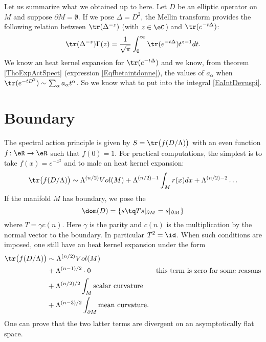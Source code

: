 Let us summarize what we obtained up to here. Let $D$ be an elliptic operator on $M$ and suppose $\partial M=\emptyset$. If we pose $\Delta=D^2$, the Mellin transform provides the following relation between $\tr(\Delta^{-z})$ (with $z\in\eC$) and $\tr( e^{-t\Delta})$:
\begin{equation}		\label{EaIntDevuspi}
\tr(\Delta^{-z})\Gamma(z)=\frac{1}{ \sqrt{\pi} }\int_0^{\infty}\tr( e^{-t\Delta})t^{z-1}dt.
\end{equation}
We know an heat kernel expansion for $\tr( e^{-t\Delta})$ and we know, from theorem \ref{ThoExpActSpect} (expression \eqref{Eqfbetaintdonne}), the values of $a_{\alpha}$ when $\tr( e^{-tD^2})\sim\sum_{\alpha}a_{\alpha}t^{\alpha}$. So we know what to put into the integral \ref{EaIntDevuspi}.

\section{Boundary}

The spectral action principle is given by $S=\tr\big( f(D/\Lambda) \big)$ with an even function $f\colon \eR\to \eR$ such that $f(0)=1$. For practical computations, the simplest is to take $f(x)= e^{-x^2}$ and to male an heat kernel expansion:
\[ 
  \tr\big( f(D/\Lambda) \big)\sim \Lambda^{(n/2)}Vol(M)+\Lambda^{(n/2)-1}\int_Mr(x)dx+\Lambda^{(n/2)-2}\ldots
\]
If the manifold $M$ has boundary, we pose the 
\begin{equation}
\dom(D)=\{ s\tq Ts|_{\partial M}=s|_{\partial M} \}
\end{equation}
where $T=\gamma c(n)$. Here $\gamma$ is the parity and $c(n)$ is the multiplication by the normal vector to the boundary. In particular $T^2=\id$. When such conditions are imposed, one still have an heat kernel expansion under the form
\begin{align}
\tr\big( f(D/\Lambda) \big)&\sim \Lambda^{(n/2)}Vol(M)\\
				&+\Lambda^{(n-1)/2}\cdot 0&\textrm{this term is zero for some reasons}\\
				&+\Lambda^{(n/2)/2}\int_M \textrm{scalar curvature}\\
				&+\Lambda^{(n-3)/2}\int_{\partial M}\textrm{mean curvature}.
\end{align}
One can prove that the two latter terms are divergent on an asymptotically flat space.

